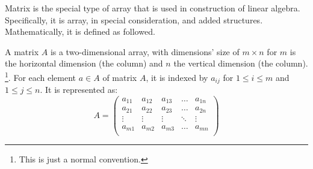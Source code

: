 Matrix is the special type of array that is used in construction of linear algebra. Specifically, it is array, in special consideration, and added structures. Mathematically, it is defined as followed. 
\begin{definition}[Matrix]
    A matrix $A$ is a two-dimensional array, with dimensions' size of $m\times n$ for $m$ is the horizontal dimension (the column) and $n$ the vertical dimension (the column). \footnote{This is just a normal convention.}. For each element $a\in A$ of matrix $A$, it is indexed by $a_{ij}$ for $1\leq i \leq m$ and $1\leq j \leq n$. It is represented as: 
    \begin{equation}
        A = \begin{pmatrix}
            a_{11} & a_{12} & a_{13} & \dots & a_{1n}\\
            a_{21} & a_{22} & a_{23} & \dots & a_{2n}\\
            \vdots & \vdots & \vdots & \ddots & \vdots \\
            a_{m1} & a_{m2} & a_{m3} & \dots & a_{mn}\\
        \end{pmatrix}
    \end{equation}
\end{definition}

